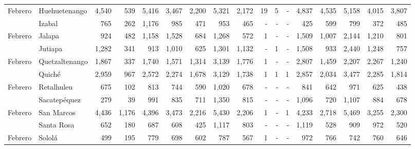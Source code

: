 \begin{landscape}
\begin{center}
\begin{longtable}{llrrrrrrrrrrrrrrr}
			\multicolumn{1}{l}{	\footnotesize	 Febrero 	}&	 Huehuetenango 	&	 4,540 	&	 539 	&	 5,416 	&	 3,467 	&	 2,200 	&	 5,321 	&	 2,172 	&	 19 	&	 5 	&	 -   	&	 4,837 	&	 4,535 	&	 5,158 	&	 4,015 	&	 3,807 	\\
			\rowcolor{color1!5!white}\multicolumn{1}{l}{	\footnotesize	 Febrero 	}&	 Izabal 	&	 765 	&	 262 	&	 1,176 	&	 985 	&	 471 	&	 953 	&	 465 	&	 -   	&	 -   	&	 -   	&	 425 	&	 599 	&	 799 	&	 372 	&	 485 	\\
			\multicolumn{1}{l}{	\footnotesize	 Febrero 	}&	 Jalapa 	&	 924 	&	 482 	&	 1,158 	&	 1,528 	&	 684 	&	 1,268 	&	 572 	&	 1 	&	 -   	&	 -   	&	 1,509 	&	 1,007 	&	 2,144 	&	 1,210 	&	 801 	\\
			\rowcolor{color1!5!white}\multicolumn{1}{l}{	\footnotesize	 Febrero 	}&	 Jutiapa 	&	 1,282 	&	 341 	&	 913 	&	 1,010 	&	 625 	&	 1,301 	&	 1,132 	&	 -   	&	 1 	&	 -   	&	 1,508 	&	 933 	&	 2,440 	&	 1,248 	&	 757 	\\
			\multicolumn{1}{l}{	\footnotesize	 Febrero 	}&	 Quetzaltenango 	&	 1,867 	&	 337 	&	 1,740 	&	 1,571 	&	 1,314 	&	 3,139 	&	 1,776 	&	 1 	&	 -   	&	 -   	&	 2,807 	&	 1,459 	&	 2,207 	&	 2,267 	&	 1,240 	\\
			\rowcolor{color1!5!white}\multicolumn{1}{l}{	\footnotesize	 Febrero 	}&	 Quiché 	&	 2,959 	&	 967 	&	 2,572 	&	 2,274 	&	 1,678 	&	 3,129 	&	 1,738 	&	 1 	&	 1 	&	 1 	&	 2,857 	&	 2,034 	&	 3,477 	&	 2,285 	&	 1,814 	\\
			\multicolumn{1}{l}{	\footnotesize	 Febrero 	}&	 Retalhuleu 	&	 675 	&	 102 	&	 813 	&	 744 	&	 590 	&	 1,020 	&	 678 	&	 -   	&	 -   	&	 -   	&	 841 	&	 642 	&	 971 	&	 625 	&	 438 	\\
			\rowcolor{color1!5!white}\multicolumn{1}{l}{	\footnotesize	 Febrero 	}&	 Sacatepéquez 	&	 279 	&	 39 	&	 991 	&	 835 	&	 711 	&	 1,350 	&	 815 	&	 -   	&	 -   	&	 -   	&	 1,096 	&	 720 	&	 1,107 	&	 884 	&	 678 	\\
			\multicolumn{1}{l}{	\footnotesize	 Febrero 	}&	 San Marcos 	&	 4,436 	&	 1,176 	&	 4,396 	&	 3,473 	&	 2,216 	&	 5,430 	&	 2,206 	&	 1 	&	 -   	&	 1 	&	 4,233 	&	 2,718 	&	 5,469 	&	 3,255 	&	 2,300 	\\
			\rowcolor{color1!5!white}\multicolumn{1}{l}{	\footnotesize	 Febrero 	}&	 Santa Rosa 	&	 652 	&	 180 	&	 687 	&	 608 	&	 425 	&	 1,117 	&	 803 	&	 -   	&	 -   	&	 -   	&	 1,119 	&	 528 	&	 909 	&	 972 	&	 520 	\\
			\multicolumn{1}{l}{	\footnotesize	 Febrero 	}&	 Sololá 	&	 499 	&	 195 	&	 779 	&	 698 	&	 602 	&	 787 	&	 567 	&	 1 	&	 -   	&	 -   	&	 972 	&	 766 	&	 742 	&	 760 	&	 646 	\\

\end{longtable}
\end{center}
\end{landscape}
